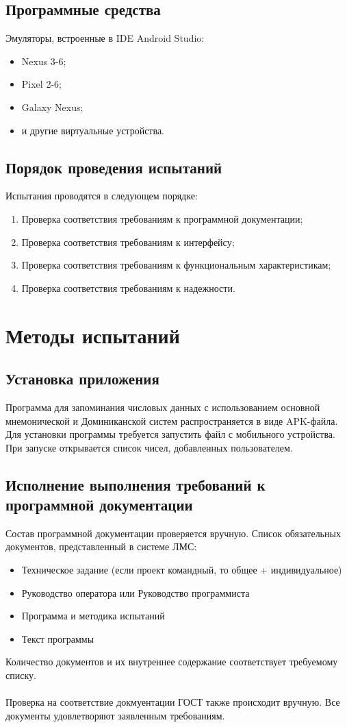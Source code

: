 \documentclass[draft]{article}
\begin{document}
\subsection {Программные средства}
Эмуляторы, встроенные в IDE Android Studio:
\begin{itemize}
\item Nexus 3-6;
\item Pixel 2-6;
\item Galaxy Nexus;
\item и другие виртуальные устройства.
\end{itemize}
\subsection {Порядок проведения испытаний}
Испытания проводятся в следующем порядке:
\begin{enumerate}
\item  Проверка соответствия требованиям к программной документации;
\item  Проверка соответствия требованиям к интерфейсу;
\item Проверка соответствия требованиям к функциональным характеристикам;
\item Проверка соответствия требованиям к надежности.
\end{enumerate}
\newpage
\section {Методы испытаний}
\subsection{Установка приложения}
Программа для запоминания числовых данных с использованием основной мнемонической и Доминиканской систем распространяется в виде APK-файла. Для установки программы требуется запустить файл с мобильного устройства. При запуске открывается список чисел, добавленных пользователем.
\subsection{Исполнение выполнения требований к программной документации}
Состав программной документации проверяется вручную. Список обязательных документов, представленный в системе ЛМС:
\begin{itemize}
\item Техническое задание (если проект командный, то общее + индивидуальное)
\item Руководство оператора или Руководство программиста 
\item Программа и методика испытаний
\item Текст программы
\end{itemize}
Количество документов и их внутреннее содержание соответствует требуемому списку.\\
~\\
Проверка на соответствие докмуентации ГОСТ также происходит вручную. Все документы удовлетворяют заявленным требованиям.
\end{document}
